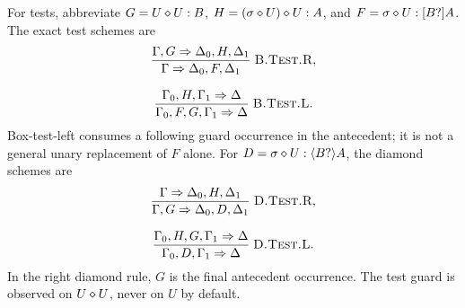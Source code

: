For tests, abbreviate $G=\ann{U\jlabel U}{B}$,
$H=\ann{(\sigma\jlabel U)\jlabel U}{A}$, and
$F=\ann{\sigma\jlabel U}{[B?]A}$. The exact test schemes are
\begin{gather*}
 \Rule{B.Test.R}{\seq{\Gamma,G}{\Delta_0,H,\Delta_1}}
   {\seq{\Gamma}{\Delta_0,F,\Delta_1}},\\[0.8em]
 \Rule{B.Test.L}{\seq{\Gamma_0,H,\Gamma_1}{\Delta}}
   {\seq{\Gamma_0,F,G,\Gamma_1}{\Delta}}.
\end{gather*}
Box-test-left consumes a following guard occurrence in the antecedent; it
is not a general unary replacement of $F$ alone. For
$D=\ann{\sigma\jlabel U}{\langle B?\rangle A}$, the diamond schemes are
\begin{gather*}
 \Rule{D.Test.R}{\seq{\Gamma}{\Delta_0,H,\Delta_1}}
   {\seq{\Gamma,G}{\Delta_0,D,\Delta_1}},\\[0.8em]
 \Rule{D.Test.L}{\seq{\Gamma_0,H,G,\Gamma_1}{\Delta}}
   {\seq{\Gamma_0,D,\Gamma_1}{\Delta}}.
\end{gather*}
In the right diamond rule, $G$ is the final antecedent occurrence.
The test guard is observed on $U\jlabel U$, never on $U$ by default.

